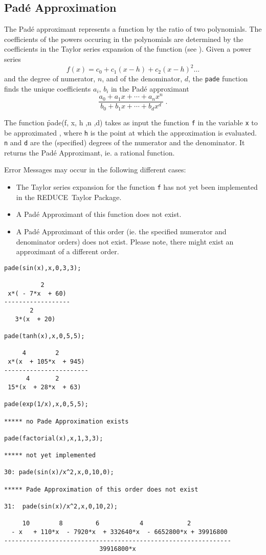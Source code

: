 \documentclass[11pt,letterpaper]{book}
\makeatletter
\newcommand{\REDUCE}{REDUCE}
\newcommand{\underscore}{\_}
\newcommand{\ttindex}[1]{{\renewcommand{\_}{\protect\underscore}%
                          \index{#1@{\tt #1}}}}
\makeatother
\begin{document}
\subsection{Pad\'{e} Approximation}

The Pad\'{e} approximant represents a function by the ratio of two
polynomials. The coefficients of the powers occuring in the polynomials
are determined by the coefficients in the Taylor series
expansion of the function (see \cite{Baker:81a}). Given a power series
\[ f(x) = c_0 + c_1 (x-h) + c_2 (x-h)^2 \ldots \]
and the degree of numerator, $n$, and of the denominator, $d$,
the {\tt pade} function finds the unique coefficients
$a_i,\, b_i$ in the Pad\'{e} approximant
\[ \frac{a_0+a_1 x+ \cdots + a_n x^n}{b_0+b_1 x+ \cdots + b_d x^d} \; .\]

The function \f{pade(f, x, h ,n ,d)\ttindex{PAD\'{E}}} takes as input the
function {\tt f} in the variable {\tt x} to be approximated , where
{\tt h} is the point at which the approximation is evaluated. {\tt n}
and {\tt d} are the (specified) degrees of the numerator and the denominator.
It returns the Pad\'{e} Approximant, ie. a rational function. \par
Error Messages may occur in the following different cases:
\begin{itemize}
\item The Taylor series expansion for the function {\tt f} has not yet been
      implemented in the \REDUCE\ Taylor Package.
\item A Pad\'{e} Approximant of this function does not exist.
\item A Pad\'{e} Approximant of this order (ie. the specified numerator and
      denominator orders) does not exist. Please note, there might exist an
      approximant of a different order.
\end{itemize}

\newpage
{\small\begin{verbatim}
pade(sin(x),x,0,3,3);

          2
 x*( - 7*x  + 60)
------------------
       2
   3*(x  + 20)

pade(tanh(x),x,0,5,5);

     4        2
 x*(x  + 105*x  + 945)
-----------------------
      4       2
 15*(x  + 28*x  + 63)

pade(exp(1/x),x,0,5,5);

***** no Pade Approximation exists

pade(factorial(x),x,1,3,3);

***** not yet implemented

30: pade(sin(x)/x^2,x,0,10,0);

***** Pade Approximation of this order does not exist

31:  pade(sin(x)/x^2,x,0,10,2);

     10        8         6           4            2
  - x   + 110*x  - 7920*x  + 332640*x  - 6652800*x + 39916800
--------------------------------------------------------------
                          39916800*x

\end{verbatim}}
\end{document}
